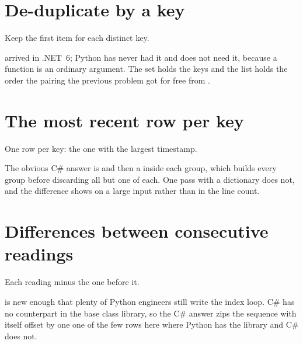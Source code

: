 \section{De-duplicate by a key}
\label{sec:appD-dedupe-by}

\noindent
Keep the first item for each distinct key.



\noindent
{} arrived in .NET~6; Python has never had it and does not need it, because a function is an ordinary argument. The set holds the keys and the list holds the order \dash{} the pairing the previous problem got for free from .

\section{The most recent row per key}
\label{sec:appD-latest}

\noindent
One row per key: the one with the largest timestamp.



\noindent
The obvious C\# answer is  and then a  inside each group, which builds every group before discarding all but one of each. One pass with a dictionary does not, and the difference shows on a large input rather than in the line count.

\section{Differences between consecutive readings}
\label{sec:appD-pairwise}

\noindent
Each reading minus the one before it.



\noindent
{} is new enough that plenty of Python engineers still write the index loop. C\# has no counterpart in the base class library, so the C\# answer zips the sequence with itself offset by one \dash{} one of the few rows here where Python has the library and C\# does not.

